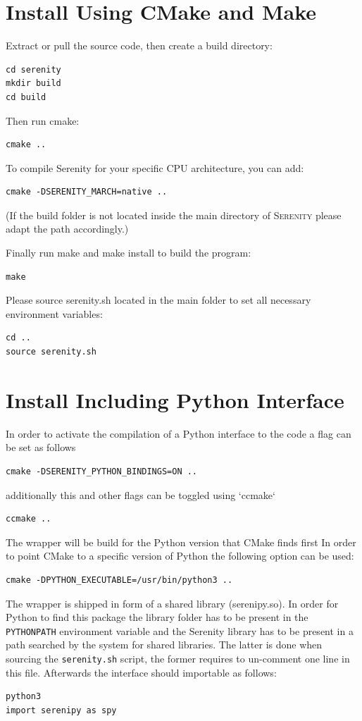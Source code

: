 \documentclass[bibliography=totocnumbered,a4paper,10pt,oneside]{scrbook}
\begin{document}
\section{Install Using CMake and Make}

Extract or pull the source code, then create a build directory:
\begin{lstlisting}
cd serenity
mkdir build
cd build
\end{lstlisting}
Then run cmake:
\begin{lstlisting}
cmake ..
\end{lstlisting}
To compile Serenity for your specific CPU architecture, you can add:
\begin{lstlisting}
cmake -DSERENITY_MARCH=native ..
\end{lstlisting}
(If the build folder is not located inside the main directory of \textsc{Serenity}
please adapt the path accordingly.)

Finally run make and make install to build the program:
\begin{lstlisting}
make
\end{lstlisting}
Please source serenity.sh located in the main folder to set all necessary environment
variables:
\begin{lstlisting}
cd ..
source serenity.sh
\end{lstlisting}
\section{Install Including Python Interface}
In order to activate the compilation of a Python interface to the code
a flag can be set as follows
\begin{lstlisting}
cmake -DSERENITY_PYTHON_BINDINGS=ON ..
\end{lstlisting}
additionally this and other flags can be toggled using `ccmake`
\begin{lstlisting}
ccmake ..
\end{lstlisting}
The wrapper will be build for the Python version that CMake finds first
In order to point CMake to a specific version of Python the following
option can be used:
\begin{lstlisting}
cmake -DPYTHON_EXECUTABLE=/usr/bin/python3 ..
\end{lstlisting}
The wrapper is shipped in form of a shared library (serenipy.so).
In order for Python to find this package the library folder has to be present
in the \texttt{PYTHONPATH} environment variable and the Serenity library has to be
present in a path searched by the system for shared libraries.
The latter is done when sourcing the \texttt{serenity.sh} script, the former requires
to un-comment one line in this file.
Afterwards the interface should importable as follows:
\begin{lstlisting}
python3
import serenipy as spy
\end{lstlisting}
\end{document}

